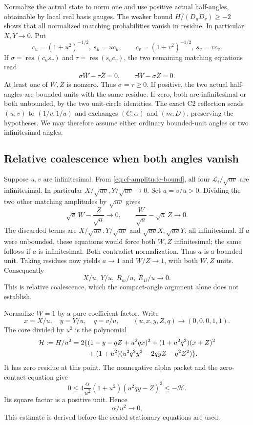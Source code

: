 Normalize the actual state to norm one and use positive actual
half-angles, obtainable by local real basis gauges. The weaker
bound \(H/(D_uD_v)\ge-2\) shows that all normalized matching
probabilities vanish in residue. In particular \(X,Y\to0\).
Put
\[
c_u=(1+u^2)^{-1/2},\ s_u=uc_u,\qquad
c_v=(1+v^2)^{-1/2},\ s_v=vc_v.
\]
If \(\sigma=\operatorname{res}(c_us_v)\) and
\(\tau=\operatorname{res}(s_uc_v)\), the two remaining matching
equations read
\[
\sigma\overline W-\tau\overline Z=0,\qquad
\tau\overline W-\sigma\overline Z=0.
\]
At least one of \(\overline W,\overline Z\) is nonzero. Thus
\(\sigma=\tau\ge0\). If positive, the two actual half-angles are
bounded units with the same residue. If zero, both are infinitesimal
or both unbounded, by the two unit-circle identities. The exact C2
reflection sends \((u,v)\) to \((1/v,1/u)\) and exchanges
\((C,\alpha)\) and \((m,D)\), preserving the hypotheses. We may
therefore assume either ordinary bounded-unit angles or two
infinitesimal angles.

\subsection{Relative coalescence when both angles vanish}
Suppose \(u,v\) are infinitesimal. From
\eqref{eq:cf-amplitude-bound}, all four
\(\mathcal L_i/\sqrt{uv}\) are infinitesimal. In particular
\(X/\sqrt{uv},Y/\sqrt{uv}\to0\). Set \(a=v/u>0\).
Dividing the two other matching amplitudes by \(\sqrt{uv}\) gives
\[
\sqrt a\,W-\frac Z{\sqrt a}\longrightarrow0,\qquad
\frac W{\sqrt a}-\sqrt a\,Z\longrightarrow0.
\]
The discarded terms are \(X/\sqrt{uv},Y/\sqrt{uv}\) and
\(\sqrt{uv}X,\sqrt{uv}Y\), all infinitesimal.
If \(a\) were unbounded, these equations would force both \(W,Z\)
infinitesimal; the same follows if \(a\) is infinitesimal.
Both contradict normalization. Thus \(a\) is a bounded unit.
Taking residues now yields \(a\to1\) and \(W/Z\to1\), with
both \(W,Z\) units. Consequently
\[
                  X/u,\ Y/u,\ R_m/u,\ R_D/u\longrightarrow0.
\]
This is relative coalescence, which the compact-angle argument alone
does not establish.

Normalize \(W=1\) by a pure coefficient factor. Write
\[
x=X/u,\quad y=Y/u,\quad q=v/u,\qquad
(u,x,y,Z,q)\longrightarrow(0,0,0,1,1).
\]
The core divided by \(u^2\) is the polynomial
\begin{align}
\mathcal H:=H/u^2=2\{&
(1-y-qZ+u^2qx)^2+(1+u^2q^2)(x+Z)^2 \notag\\
&+(1+u^2)(u^2q^2y^2-2qyZ-q^2Z^2)\}. \label{eq:cf-scaled-core}
\end{align}
It has zero residue at this point. The nonnegative alpha packet and
the zero-contact equation give
\[
0\le4\frac{\alpha}{u^2}(1+u^2)(u^2qy-Z)^2
                   \le-\mathcal H.
\]
Its square factor is a positive unit. Hence
\begin{equation}
                         \alpha/u^2\longrightarrow0. \label{eq:cf-alpha-scale}
\end{equation}
This estimate is derived before the scaled stationary equations are used.

